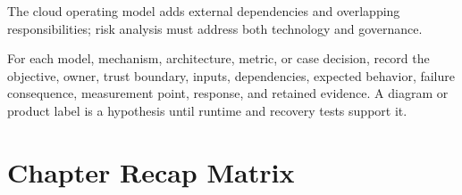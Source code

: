 \documentclass[11pt]{article}
\begin{document}
\begin{sectionsummarybox}
The cloud operating model adds external dependencies and overlapping responsibilities; risk analysis must address both technology and governance.
\end{sectionsummarybox}
\begin{practicebox}
For each model, mechanism, architecture, metric, or case decision, record the objective, owner, trust boundary, inputs, dependencies, expected behavior, failure consequence, measurement point, response, and retained evidence. A diagram or product label is a hypothesis until runtime and recovery tests support it.
\end{practicebox}
\section{Chapter Recap Matrix}
\begingroup\small\setlength{\tabcolsep}{4pt}
\end{document}
